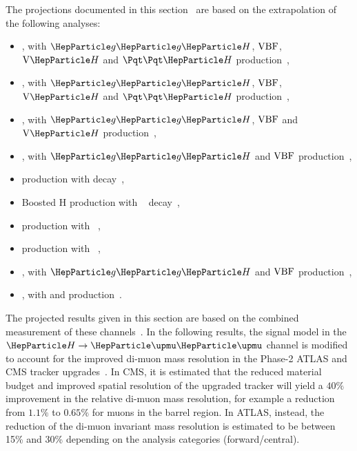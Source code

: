 The projections documented in this section~\cite{CMS-PAS-FTR-18-011,ATL-PHYS-PUB-2018-054} are based on the extrapolation of the following analyses:

\begin{itemize}
	\item \hgg, with $\ggh$, $\mathrm{VBF}$, $\vh$ and $\tth$ production~\cite{Sirunyan:2018ouh,ATLAS-CONF-2018-028,Aaboud:2018urx},
	\item \hzzllll, with $\ggh$, $\mathrm{VBF}$, $\vh$ and $\tth$ production~\cite{HIG16041,ATLAS-CONF-2018-018},
	\item \hwwlnln, with $\ggh$, $\mathrm{VBF}$ and $\vh$ production~\cite{HIG-16-042,Aaboud:2018jqu},
	\item \htt, with $\ggh$ and $\mathrm{VBF}$ production~\cite{HIG16043,ATLAS-CONF-2018-021},
	\item \vh production with \hbb decay~\cite{HIG16044,Aaboud:2018zhk},
	\item Boosted H production with \hbb~ decay~\cite{HIG17010},
	\item \tth production with \hlep~\cite{Sirunyan:2018shy,Aaboud:2017jvq},
	\item \tth production with \hbb~\cite{bib:hig-17-026,Sirunyan:2018ygk,Aaboud:2017rss},
	\item \hmm, with $\ggh$ and $\mathrm{VBF}$ production~\cite{HIG-17-019,ATLAS-CONF-2018-026},
	\item \hzg, with \ggh and \vbf production~\cite{Aaboud:2017uhw}.
\end{itemize}

The projected results given in this section are based on the combined measurement of these channels~\cite{Sirunyan:2018koj,ATLAS-CONF-2018-031}. In the following results, the signal model in the $\hmm$ channel is modified to account for the improved di-muon mass resolution in the Phase-2 ATLAS and CMS tracker upgrades~\cite{Klein:2017nke,Collaboration:2285585}. In CMS, it is estimated that the reduced material budget and improved spatial resolution of the upgraded tracker will yield a $40\%$ improvement in the relative di-muon mass resolution, for example a reduction from $1.1\%$ to $0.65\%$ for muons in the barrel region. In ATLAS, instead, the reduction of the di-muon invariant mass resolution is estimated to be between 15\% and 30\% depending on the analysis categories (forward/central).


